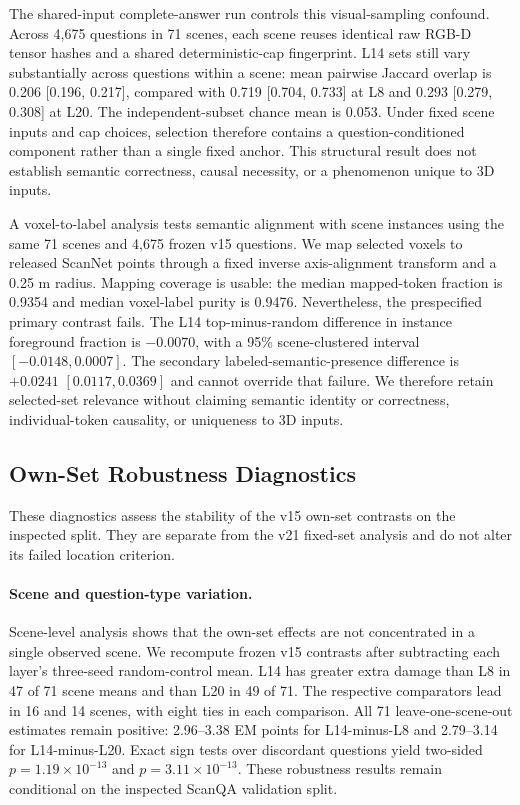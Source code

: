 The shared-input complete-answer run controls this visual-sampling confound. Across 4,675 questions in 71 scenes, each scene reuses identical raw RGB-D tensor hashes and a shared deterministic-cap fingerprint. L14 sets still vary substantially across questions within a scene: mean pairwise Jaccard overlap is 0.206 [0.196, 0.217], compared with 0.719 [0.704, 0.733] at L8 and 0.293 [0.279, 0.308] at L20. The independent-subset chance mean is 0.053. Under fixed scene inputs and cap choices, selection therefore contains a question-conditioned component rather than a single fixed anchor. This structural result does not establish semantic correctness, causal necessity, or a phenomenon unique to 3D inputs.

A voxel-to-label analysis tests semantic alignment with scene instances using the same 71 scenes and 4,675 frozen v15 questions. We map selected voxels to released ScanNet points through a fixed inverse axis-alignment transform and a 0.25 m radius. Mapping coverage is usable: the median mapped-token fraction is 0.9354 and median voxel-label purity is 0.9476. Nevertheless, the prespecified primary contrast fails. The L14 top-minus-random difference in instance foreground fraction is $-0.0070$, with a 95\% scene-clustered interval $[-0.0148,0.0007]$. The secondary labeled-semantic-presence difference is $+0.0241$ $[0.0117,0.0369]$ and cannot override that failure. We therefore retain selected-set relevance without claiming semantic identity or correctness, individual-token causality, or uniqueness to 3D inputs.

\subsection{Own-Set Robustness Diagnostics}
These diagnostics assess the stability of the v15 own-set contrasts on the inspected split. They are separate from the v21 fixed-set analysis and do not alter its failed location criterion.

\paragraph{Scene and question-type variation.} Scene-level analysis shows that the own-set effects are not concentrated in a single observed scene. We recompute frozen v15 contrasts after subtracting each layer's three-seed random-control mean. L14 has greater extra damage than L8 in 47 of 71 scene means and than L20 in 49 of 71. The respective comparators lead in 16 and 14 scenes, with eight ties in each comparison. All 71 leave-one-scene-out estimates remain positive: 2.96--3.38 EM points for L14-minus-L8 and 2.79--3.14 for L14-minus-L20. Exact sign tests over discordant questions yield two-sided $p=1.19\times10^{-13}$ and $p=3.11\times10^{-13}$. These robustness results remain conditional on the inspected ScanQA validation split.

